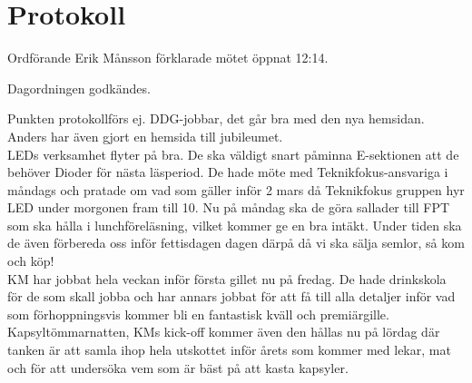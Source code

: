\documentclass[10pt]{article}
\def\mo{Erik Månsson}
\begin{document}
\section*{Protokoll}
\begin{paragrafer}
Ordförande {\mo} förklarade mötet öppnat 12:14.

{\valavmo}

{\valavms}

{\valavj}

{\tosg}

{\ingaadj}


Dagordningen godkändes.


\begin{fyllnadsval} %
\end{fyllnadsval}

\begin{paragrafer}
Punkten protokollförs ej.
DDG-jobbar, det går bra med den nya hemsidan. Anders har även gjort en hemsida till jubileumet.\\

LEDs verksamhet flyter på bra. De ska väldigt snart påminna E-sektionen att de behöver Dioder för nästa läsperiod. De hade möte med Teknikfokus-ansvariga i måndags och pratade om vad som gäller inför 2 mars då Teknikfokus gruppen hyr LED under morgonen fram till 10. Nu på måndag ska de göra sallader till FPT som ska hålla i lunchföreläsning, vilket kommer ge en bra intäkt. Under tiden ska de även förbereda oss inför fettisdagen dagen därpå då vi ska sälja semlor, så kom och köp! \\

KM har jobbat hela veckan inför första gillet nu på fredag. De hade drinkskola för de som skall jobba och har annars jobbat för att få till alla detaljer inför vad som förhoppningsvis kommer bli en fantastisk kväll och premiärgille. Kapsyltömmarnatten, KMs kick-off kommer även den hållas nu på lördag där tanken är att samla ihop hela utskottet inför årets som kommer med lekar, mat och för att undersöka vem som är bäst på att kasta kapsyler.


\end{paragrafer}
\end{paragrafer}
\end{document}

